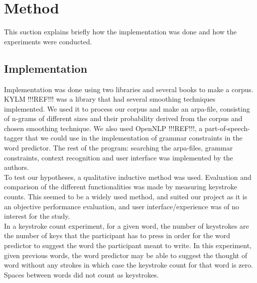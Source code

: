 \section{Method}
This suction explains briefly how the implementation was done and how the experiments were conducted.
\subsection{Implementation}
Implementation was done using two libraries and several books to make a corpus. KYLM !!!REF!!! was a library that had several smoothing techniques implemented. We used it to process our corpus and make an arpa-file, consisting of n-grams of different sizes and their probability derived from the corpus and chosen smoothing technique. We also used OpenNLP !!!REF!!!, a part-of-speech-tagger that we could use in the implementation of grammar constraints in the word predictor. The rest of the program: searching the arpa-files, grammar constraints, context recognition and user interface was implemented by the authors.\\

To test our hypotheses, a qualitative inductive method was used. Evaluation and comparison of the different functionalities was made by measuring keystroke counts. This seemed to be a widely used method, and suited our project as it is an objective performance evaluation, and user interface/experience was of no interest for the study.\\

In a keystroke count experiment, for a given word, the number of keystrokes are the number of keys that the participant has to press in order for the word predictor to suggest the word the participant meant to write. In this experiment, given previous words, the word predictor may be able to suggest the thought of word without any strokes in which case the keystroke count for that word is zero. Spaces between words did not count as keystrokes.

